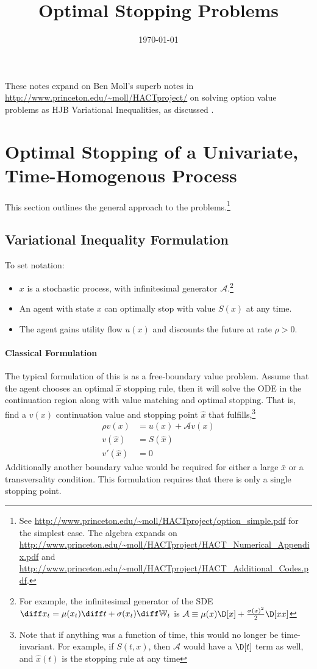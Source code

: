 \documentclass[11pt]{etk-article}
\begin{document}
\title{Optimal Stopping Problems}
\date{\today}
\maketitle
These notes expand on Ben Moll's superb notes in \url{http://www.princeton.edu/~moll/HACTproject/} on solving option value problems as HJB Variational Inequalities, as discussed \cite{HuangPang1998}.

\section{Optimal Stopping of a Univariate, Time-Homogenous Process}
This section outlines the general approach to the problems.\footnote{See \url{http://www.princeton.edu/~moll/HACTproject/option_simple.pdf} for the simplest case.  The algebra expands on \url{http://www.princeton.edu/~moll/HACTproject/HACT_Numerical_Appendix.pdf} and \url{http://www.princeton.edu/~moll/HACTproject/HACT_Additional_Codes.pdf}.}
\subsection{Variational Inequality Formulation}
To set notation:
\begin{itemize}
	\item $x$ is a stochastic process, with infinitesimal generator $\mathcal{A}$.\footnote{For example, the infinitesimal generator of the SDE $\diff x_t = \mu(x_t)\diff t + \sigma(x_t)\diff\mathbb{W}_t$ is  $\mathcal{A} \equiv \mu(x)\D[x] + \frac{\sigma(x)^2}{2}\D[xx]$}
	\item An agent with state $x$ can optimally stop with value $S(x)$ at any time.
	\item The agent gains utility flow $u(x)$ and discounts the future at rate $\rho > 0$.
\end{itemize}


\paragraph{Classical Formulation}
The typical formulation of this is as a free-boundary value problem.  Assume that the agent chooses an optimal $\hat{x}$ stopping rule, then it will solve the ODE in the continuation region along with value matching and optimal stopping.  That is, find a $v(x)$ continuation value and stopping point $\hat{x}$ that fulfills,\footnote{Note that if anything was a function of time, this would no longer be time-invariant.  For example, if $S(t,x)$, then $\mathcal{A}$ would have a $\D[t]$ term as well, and $\hat{x}(t)$ is the stopping rule at any time}
\begin{align}
	\rho v(x) &= u(x) + \mathcal{A} v(x)\\
	v(\hat{x}) &= S(\hat{x})\\
	v'(\hat{x}) &= 0
\end{align}	
Additionally another boundary value would be required for either a large $\bar{x}$ or a transversality condition.  This formulation requires that there is only a single stopping point.
\end{document}
